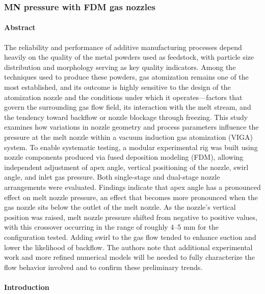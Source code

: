 \documentclass[../../../main.tex]{subfiles}
\begin{document}
\subsubsection{MN pressure with FDM gas nozzles}

\paragraph{Abstract}

The reliability and performance of additive manufacturing processes depend heavily on the quality of the metal powders used as feedstock, with particle size distribution and morphology serving as key quality indicators. Among the techniques used to produce these powders, gas atomization remains one of the most established, and its outcome is highly sensitive to the design of the atomization nozzle and the conditions under which it operates—factors that govern the surrounding gas flow field, its interaction with the melt stream, and the tendency toward backflow or nozzle blockage through freezing.
This study examines how variations in nozzle geometry and process parameters influence the pressure at the melt nozzle within a vacuum induction gas atomization (VIGA) system. To enable systematic testing, a modular experimental rig was built using nozzle components produced via fused deposition modeling (FDM), allowing independent adjustment of apex angle, vertical positioning of the nozzle, swirl angle, and inlet gas pressure. Both single-stage and dual-stage nozzle arrangements were evaluated.
Findings indicate that apex angle has a pronounced effect on melt nozzle pressure, an effect that becomes more pronounced when the gas nozzle sits below the outlet of the melt nozzle. As the nozzle's vertical position was raised, melt nozzle pressure shifted from negative to positive values, with this crossover occurring in the range of roughly 4–5 mm for the configuration tested. Adding swirl to the gas flow tended to enhance suction and lower the likelihood of backflow. The authors note that additional experimental work and more refined numerical models will be needed to fully characterize the flow behavior involved and to confirm these preliminary trends.

\paragraph{Introduction}
\end{document}
